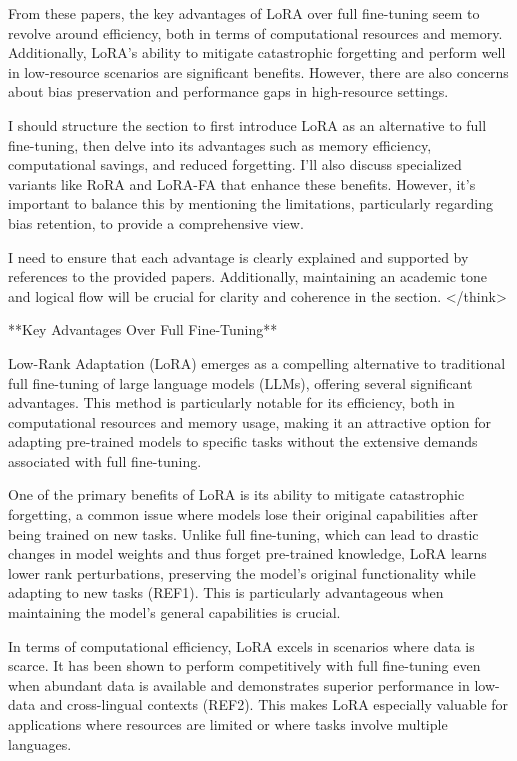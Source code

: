 \documentclass[conference]{IEEEtran}
\begin{document}
From these papers, the key advantages of LoRA over full fine-tuning seem to revolve around efficiency, both in terms of computational resources and memory. Additionally, LoRA's ability to mitigate catastrophic forgetting and perform well in low-resource scenarios are significant benefits. However, there are also concerns about bias preservation and performance gaps in high-resource settings.

I should structure the section to first introduce LoRA as an alternative to full fine-tuning, then delve into its advantages such as memory efficiency, computational savings, and reduced forgetting. I'll also discuss specialized variants like RoRA and LoRA-FA that enhance these benefits. However, it's important to balance this by mentioning the limitations, particularly regarding bias retention, to provide a comprehensive view.

I need to ensure that each advantage is clearly explained and supported by references to the provided papers. Additionally, maintaining an academic tone and logical flow will be crucial for clarity and coherence in the section.
</think>

**Key Advantages Over Full Fine-Tuning**

Low-Rank Adaptation (LoRA) emerges as a compelling alternative to traditional full fine-tuning of large language models (LLMs), offering several significant advantages. This method is particularly notable for its efficiency, both in computational resources and memory usage, making it an attractive option for adapting pre-trained models to specific tasks without the extensive demands associated with full fine-tuning.

One of the primary benefits of LoRA is its ability to mitigate catastrophic forgetting, a common issue where models lose their original capabilities after being trained on new tasks. Unlike full fine-tuning, which can lead to drastic changes in model weights and thus forget pre-trained knowledge, LoRA learns lower rank perturbations, preserving the model's original functionality while adapting to new tasks (REF1). This is particularly advantageous when maintaining the model's general capabilities is crucial.

In terms of computational efficiency, LoRA excels in scenarios where data is scarce. It has been shown to perform competitively with full fine-tuning even when abundant data is available and demonstrates superior performance in low-data and cross-lingual contexts (REF2). This makes LoRA especially valuable for applications where resources are limited or where tasks involve multiple languages.
\end{document}
